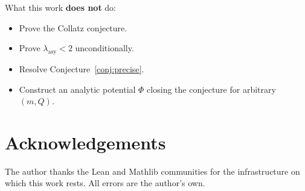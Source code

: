 \documentclass[11pt,a4paper]{article}
\theoremstyle{plain}
\theoremstyle{definition}
\begin{document}
What this work \textbf{does not} do:
\begin{itemize}
  \item Prove the Collatz conjecture.
  \item Prove $\lambda_{\mathrm{asy}} < 2$ unconditionally.
  \item Resolve Conjecture~\ref{conj:precise}.
  \item Construct an analytic potential $\Phi$ closing the
        conjecture for arbitrary $(m, Q)$.
\end{itemize}

\section*{Acknowledgements}
The author thanks the Lean and Mathlib communities for the
infrastructure on which this work rests. All errors are the
author's own.
\end{document}
